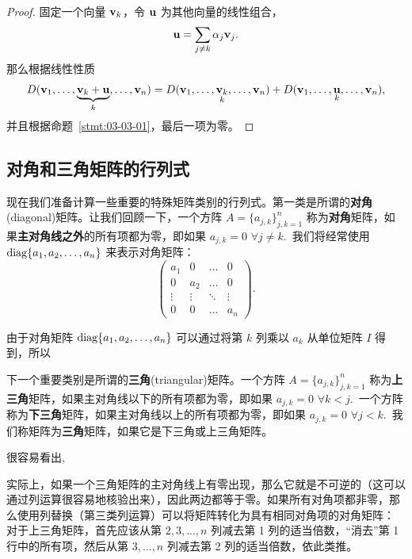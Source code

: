 \begin{proof} 固定一个向量 $\mathbf{v}_k$，令 $\mathbf{u}$ 为其他向量的线性组合，$$\mathbf{u} = \sum_{j \neq k} \alpha_j \mathbf{v}_j.$$
那么根据线性性质
$$
D(\mathbf{v}_1, \dots, \underset{k}{\underbrace{\mathbf{v}_k + \mathbf{u}}}, \dots, \mathbf{v}_n) = D(\mathbf{v}_1, \dots, \underset{k}{\mathbf{v}_k}, \dots, \mathbf{v}_n) + D(\mathbf{v}_1, \dots, \underset{k}{\mathbf{u}}, \dots, \mathbf{v}_n),
$$
并且根据命题~\ref{stmt:03-03-01}，最后一项为零。\end{proof}

\subsection{对角和三角矩阵的行列式}\label{sec:03-03-03}

现在我们准备计算一些重要的特殊矩阵类别的行列式。第一类是所谓的\textbf{对角}(diagonal)矩阵。让我们回顾一下，一个方阵 $A = \{a_{j,k}\}^{n}_{j,k=1}$ 称为\textbf{对角}矩阵，如果\textbf{主对角线之外}的所有项都为零，即如果 $a_{j,k} = 0$ $\forall j \neq k$.~我们将经常使用 $\operatorname{diag}\{a_1, a_2, \dots, a_n\}$ 来表示对角矩阵：
$$
\begin{pmatrix}
a_1 & 0 & \dots & 0 \\
0 & a_2 & \dots & 0 \\
\vdots & \vdots & \ddots & \vdots \\
0 & 0 & \dots & a_n
\end{pmatrix}.
$$

由于对角矩阵 $\operatorname{diag}\{a_1, a_2, \dots, a_n\}$ 可以通过将第 $k$ 列乘以 $a_k$ 从单位矩阵 $I$ 得到，所以

\noindent{}

下一个重要类别是所谓的\textbf{三角}(triangular)矩阵。一个方阵 $A = \{a_{j,k}\}^{n}_{j,k=1}$ 称为\textbf{上三角}矩阵，如果主对角线以下的所有项都为零，即如果 $a_{j,k} = 0$ $\forall k < j$.~一个方阵称为\textbf{下三角}矩阵，如果主对角线以上的所有项都为零，即如果 $a_{j,k} = 0$ $\forall j < k$.~我们称矩阵为\textbf{三角}矩阵，如果它是下三角或上三角矩阵。

很容易看出,

\noindent{}

实际上，如果一个三角矩阵的主对角线上有零出现，那么它就是不可逆的（这可以通过列运算很容易地核验出来），因此两边都等于零。如果所有对角项都非零，那么使用列替换（第三类列运算）可以将矩阵转化为具有相同对角项的对角矩阵：
对于上三角矩阵，首先应该从第 $2,3,...,n$ 列减去第 1 列的适当倍数，“消去”第 1 行中的所有项，然后从第 $3,...,n$ 列减去第 2 列的适当倍数，依此类推。

